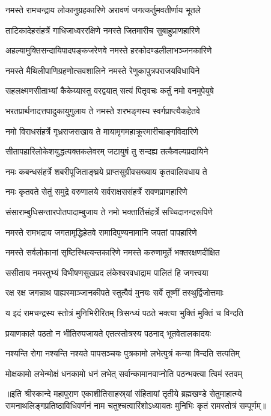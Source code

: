 
\addtocounter{shlokacount}{62}

\twolineshloka
{नमस्ते रामचन्द्राय लोकानुग्रहकारिणे}
{अरावणं जगत्कर्तुमवतीर्णाय भूतले} %

\twolineshloka
{ताटिकादेहसंहर्त्रे गाधिजाध्वररक्षिणे}
{नमस्ते जितमारीच सुबाहुप्राणहारिणे} %

\twolineshloka
{अहल्यामुक्तिसन्दायिपादपङ्कजरेणवे}
{नमस्ते हरकोदण्डलीलाभञ्जनकारिणे} %

\twolineshloka
{नमस्ते मैथिलीपाणिग्रहणोत्सवशालिने}
{नमस्ते रेणुकापुत्रपराजयविधायिने} %

\twolineshloka
{सहलक्ष्मणसीताभ्यां कैकेय्यास्तु वरद्वयात्}
{सत्यं पितृवचः कर्तुं नमो वनमुपेयुषे} %

\twolineshloka
{भरतप्रार्थनादत्तपादुकायुगुलाय ते}
{नमस्ते शरभङ्गस्य स्वर्गप्राप्त्यैकहेतवे} %

\twolineshloka
{नमो विराधसंहर्त्रे गृध्रराजसखाय ते}
{मायामृगमहाक्रूरमारीचाङ्गविदारिणे} %

\twolineshloka
{सीतापहारिलोकेशयुद्धत्यक्तकलेवरम्}
{जटायुषं तु सन्दह्य तत्कैवल्यप्रदायिने} %

\twolineshloka
{नमः कबन्धसंहर्त्रे शबरीपूजिताङ्घ्रये}
{प्राप्तसुग्रीवसख्याय कृतवालिवधाय ते} %

\twolineshloka
{नमः कृतवते सेतुं समुद्रे वरुणालये}
{सर्वराक्षससंहर्त्रे रावणप्राणहारिणे} %

\twolineshloka
{संसाराम्बुधिसन्तारपोतपादाम्बुजाय ते}
{नमो भक्तार्तिसंहर्त्रे सच्चिदानन्दरूपिणे} %

\twolineshloka
{नमस्ते रामभद्राय जगतामृद्धिहेतवे}
{रामादिपुण्यनामानि जपतां पापहारिणे} %

\twolineshloka
{नमस्ते सर्वलोकानां सृष्टिस्थित्यन्तकारिणे}
{नमस्ते करुणामूर्ते भक्तरक्षणदीक्षित} %

\twolineshloka
{ससीताय नमस्तुभ्यं विभीषणसुखप्रद}
{लंकेश्वरवधाद्राम पालितं हि जगत्त्वया} %

\twolineshloka
{रक्ष रक्ष जगन्नाथ पाह्यस्माञ्जानकीपते}
{स्तुत्वैवं मुनयः सर्वे तूष्णीं तस्थुर्द्विजोत्तमाः} %


\twolineshloka
{य इदं रामचन्द्रस्य स्तोत्रं मुनिभिरीरितम्}
{त्रिसन्ध्यं पठते भक्त्या भुक्तिं मुक्तिं च विन्दति} %

\twolineshloka
{प्रयाणकाले पठतो न भीतिरुपजायते}
{एतत्स्तोत्रस्य पठनाद् भूतवेतालकादयः} %

\twolineshloka
{नश्यन्ति रोगा नश्यन्ति नश्यते पापसञ्चयः}
{पुत्रकामो लभेत्पुत्रं कन्या विन्दति सत्पतिम्} %

\twolineshloka
{मोक्षकामो लभेन्मोक्षं धनकामो धनं लभेत्}
{सर्वान्कामानवाप्नोति पठन्भक्त्या त्विमं स्तवम्} %

॥इति श्रीस्कान्दे महापुराण एकाशीतिसाहस्र्यां संहितायां तृतीये ब्रह्मखण्डे सेतुमाहात्म्ये रामनाथलिङ्गप्रतिष्ठाविधिवर्णनं नाम चतुश्चत्वारिंशोऽध्यायतः मुनिभिः कृतं रामस्तोत्रं सम्पूर्णम्॥
